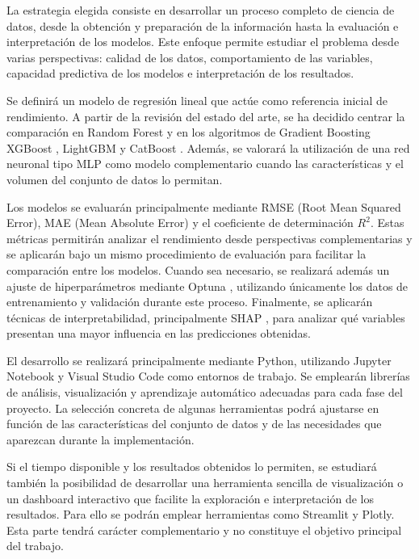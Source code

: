 \documentclass[IB]{TFUOC}%
\begin{document}
La estrategia elegida consiste en desarrollar un proceso completo de ciencia de datos, desde la obtención y preparación de la información hasta la evaluación e interpretación de los modelos. Este enfoque permite estudiar el problema desde varias perspectivas: calidad de los datos, comportamiento de las variables, capacidad predictiva de los modelos e interpretación de los resultados.

Se definirá un modelo de regresión lineal que actúe como referencia inicial de rendimiento. A partir de la revisión del estado del arte, se ha decidido centrar la comparación en Random Forest y en los algoritmos de Gradient Boosting XGBoost \cite{chen2016xgboost}, LightGBM \cite{ke2017lightgbm} y CatBoost \cite{prokhorenkova2018catboost}. Además, se valorará la utilización de una red neuronal tipo MLP como modelo complementario cuando las características y el volumen del conjunto de datos lo permitan.

Los modelos se evaluarán principalmente mediante RMSE (Root Mean Squared Error), MAE (Mean Absolute Error) y el coeficiente de determinación $R^2$. Estas métricas permitirán analizar el rendimiento desde perspectivas complementarias y se aplicarán bajo un mismo procedimiento de evaluación para facilitar la comparación entre los modelos. Cuando sea necesario, se realizará además un ajuste de hiperparámetros mediante Optuna \cite{akiba2019optuna}, utilizando únicamente los datos de entrenamiento y validación durante este proceso. Finalmente, se aplicarán técnicas de interpretabilidad, principalmente SHAP \cite{lundberg2017shap}, para analizar qué variables presentan una mayor influencia en las predicciones obtenidas.

El desarrollo se realizará principalmente mediante Python, utilizando Jupyter Notebook y Visual Studio Code como entornos de trabajo. Se emplearán librerías de análisis, visualización y aprendizaje automático adecuadas para cada fase del proyecto. La selección concreta de algunas herramientas podrá ajustarse en función de las características del conjunto de datos y de las necesidades que aparezcan durante la implementación.

Si el tiempo disponible y los resultados obtenidos lo permiten, se estudiará también la posibilidad de desarrollar una herramienta sencilla de visualización o un dashboard interactivo que facilite la exploración e interpretación de los resultados. Para ello se podrán emplear herramientas como Streamlit y Plotly. Esta parte tendrá carácter complementario y no constituye el objetivo principal del trabajo.
\end{document}
